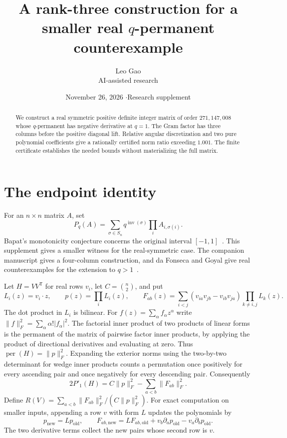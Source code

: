 \documentclass[11pt]{article}
\title{A rank-three construction for a smaller real $q$-permanent counterexample}
\author{Leo Gao\\[-1pt]{\small AI-assisted research}}
\date{November 26, 2026 \quad$\cdot$\quad Research supplement}
\DeclareMathOperator{\perma}{per}
\begin{document}
\maketitle
\begin{abstract}
We construct a real symmetric positive definite integer matrix of order $271{,}147{,}008$ whose $q$-permanent has negative derivative at $q=1$. The Gram factor has three columns before the positive diagonal lift. Relative angular discretization and two pure polynomial coefficients give a rationally certified norm ratio exceeding $1.001$. The finite certificate establishes the needed bounds without materializing the full matrix.
\end{abstract}

\section{The endpoint identity}

For an $n\times n$ matrix $A$, set
\[
 P_q(A)=\sum_{\sigma\in S_n}q^{\operatorname{inv}(\sigma)}\prod_i A_{i,\sigma(i)}.
\]
Bapat's monotonicity conjecture concerns the original interval $[-1,1]$~\cite{BL}. This supplement gives a smaller witness for the real-symmetric case. The companion manuscript gives a four-column construction, and da Fonseca and Goyal give real counterexamples for the extension to $q>1$~\cite{FG}.

Let $H=VV^{\mathsf T}$ for real rows $v_i$, let $C=\binom n2$, and put
\[
 L_i(z)=v_i\cdot z,\qquad p(z)=\prod_iL_i(z),\qquad
 F_{ab}(z)=\sum_{i<j}(v_{ia}v_{jb}-v_{ib}v_{ja})\prod_{k\ne i,j}L_k(z).
\]
The dot product in $L_i$ is bilinear. For $f(z)=\sum_\alpha f_\alpha z^\alpha$ write $\|f\|_F^2=\sum_\alpha\alpha!|f_\alpha|^2$.
The factorial inner product of two products of linear forms is the permanent of the matrix of pairwise factor inner products, by applying the product of directional derivatives and evaluating at zero. Thus $\perma(H)=\|p\|_F^2$. Expanding the exterior norms using the two-by-two determinant for wedge inner products counts a permutation once positively for every ascending pair and once negatively for every descending pair. Consequently
\begin{equation}\label{eq:endpoint}
 2P'_1(H)=C\|p\|_F^2-\sum_{a<b}\|F_{ab}\|_F^2.
\end{equation}
Define $R(V)=\sum_{a<b}\|F_{ab}\|_F^2/(C\|p\|_F^2)$. For exact computation on smaller inputs, appending a row $v$ with form $L$ updates the polynomials by
\[
 p_{\mathrm{new}}=L p_{\mathrm{old}},\qquad
 F_{ab,\mathrm{new}}=L F_{ab,\mathrm{old}}+v_b\partial_a p_{\mathrm{old}}-v_a\partial_b p_{\mathrm{old}}.
\]
The two derivative terms collect the new pairs whose second row is $v$.
\end{document}
